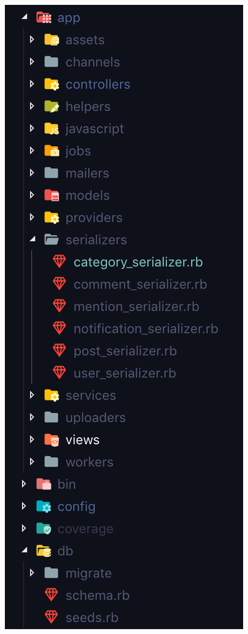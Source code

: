 \documentclass[declaration,shortabstract]{iithesis}
\begin{document}
\begin{figure}
    \centering
    \begin{minipage}[b]{0.4\textwidth}
        \includegraphics[width=\textwidth]{images/serwer1.png}

\end{minipage}
\end{figure}
\end{document}
